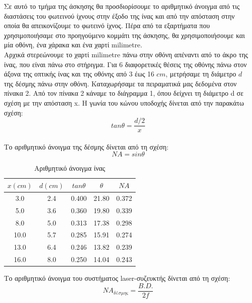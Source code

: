 \documentclass[a4paper,11pt,titlepage]{article}
\begin{document}
Σε αυτό το τμήμα της άσκησης θα προσδιορίσουμε το αριθμητικό άνοιγμα από τις διαστάσεις του φωτεινού ίχνους στην έξοδο της ίνας και από την απόσταση στην οποία θα απεικονίζουμε το φωτεινό ίχνος. Πέρα από τα εξαρτήματα που χρησιμοποιήσαμε στο προηγούμενο κομμάτι της άσκησης, θα χρησιμοποιήσουμε και μία οθόνη, ένα χάρακα και ένα χαρτί milimetre.\\
Αρχικά στερεώνουμε το χαρτί milimetre πάνω στην οθόνη απέναντι από το άκρο της ίνας, που είναι πάνω στο στήριγμα. Για 6 διαφορετικές θέσεις της οθόνης πάνω στον άξονα της οπτικής ίνας και της οθόνης από 3 έως 16 $cm$, μετρήσαμε τη διάμετρο $d$ της δέσμης πάνω στην οθόνη. Καταχωρήσαμε τα πειραματικά μας δεδομένα στον πίνακα 2. 
Από τον πίνακα 2 κάναμε το διάγραμμα 1, όπου δείχνει τη διάμετρο d σε σχέση με την απόσταση x.
Η γωνία του κώνου υποδοχής δίνεται από την παρακάτω σχέση:	
\begin{equation}
tanθ=\frac{d/2}{x}
\end{equation}
\\
Το αριθμητικό άνοιγμα της δέσμης δίνεται από τη σχέση:	
\begin{equation}
NA=sin\theta	
\end{equation}

\begin{table} [bph!]
\centering
\begin{tabular}{|c|c|c|c|c|}
\hline \rule[-2ex]{0pt}{5.5ex} $x (cm)$ 	& $d (cm)$ 	& $tan\theta$ 	& $\theta$ 	& $NA$ 		\\
\hline \rule[-2ex]{0pt}{5.5ex} 3.0 		& 2.4 		& 0.400 		& 21.80 	& 0.372 	\\
\hline \rule[-2ex]{0pt}{5.5ex} 5.0 		& 3.6 		& 0.360 		& 19.80 	& 0.339 	\\
\hline \rule[-2ex]{0pt}{5.5ex} 8.0 		& 5.0 		& 0.313 		& 17.38 	& 0.298 	\\
\hline \rule[-2ex]{0pt}{5.5ex} 10.0 	& 5.7 		& 0.285 		& 15.91 	& 0.274 	\\
\hline \rule[-2ex]{0pt}{5.5ex} 13.0 	& 6.4 		& 0.246 		& 13.82 	& 0.239 	\\
\hline \rule[-2ex]{0pt}{5.5ex} 16.0 	& 8.0 		& 0.250 		& 14.04 	& 0.243 	\\
\hline 
\end{tabular} 
\caption{Αριθμητικό άνοιγμα ίνας}
\end{table} 

Το αριθμητικό άνοιγμα του συστήματος laser-συζευκτής δίνεται από τη σχέση:	
\begin{equation}
NA_{δέσμης}=\frac{B.D.}{2f}
\end{equation}
\end{document}
